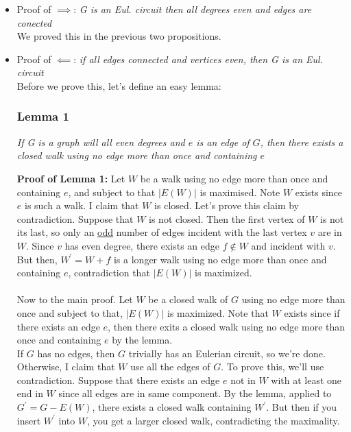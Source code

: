 \documentclass{report}
\begin{document}
\begin{itemize}
\item Proof of $\implies$: \textit{G is an Eul. circuit then all degrees even and edges are conected}\\
We proved this in the previous two propositions.
\item Proof of $\impliedby$: \textit{if all edges connected and vertices even, then G is an Eul. circuit}\\
Before we prove this, let's define an easy lemma:
\subsubsection{Lemma 1}
\begin{center}
\textit{If G is a graph will all even degrees and $e$ is an edge of $G$, then there exists a closed walk using no edge more than once and containing $e$}
\end{center}
\textbf{Proof of Lemma 1:} Let $W$ be a walk using no edge more than once and containing $e$, and subject to that $\vert E(W) \vert$ is maximised. Note $W$ exists since $e$ is such a walk. I claim that $W$ is closed.
Let's prove this claim by contradiction. Suppose that $W$ is not closed. Then the first vertex of $W$ is not its last, so only an \underline{odd} number of edges incident with the last vertex $v$ are in $W$. Since $v$ has even degree, there exists an edge $f \not\in W$ and incident with $v$. But then, $W^\prime = W + f$ is a longer walk using no edge more than once and containing $e$, contradiction that $\vert E(W)\vert$ is maximized.\\\\
Now to the main proof. Let $W$ be a closed walk of $G$ using no edge more than once and subject to that, $\vert E(W) \vert$ is maximized. Note that $W$ exists since if there exists an edge $e$, then there exits a closed walk using no edge more than once and containing $e$ by the lemma. \\
If $G$ has no edges, then $G$ trivially has an Eulerian circuit, so we're done. Otherwise, I claim that $W$ use all the edges of $G$. To prove this, we'll use contradiction. Suppose that there exists an edge $e$ not in $W$ with at least one end in $W$  since all edges are in same component. By the lemma, applied to $G^\prime = G - E(W)$, there exists a closed walk containing $W^\prime$. But then if you insert $W^\prime$ into $W$, you get a larger closed walk, contradicting the maximality.
\end{itemize}
\end{document}
